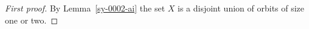 \begin{proof}[First proof]\label{sy-0004-ai}
By Lemma~\ref{sy-0002-ai} the set $X$ is a disjoint union of orbits of size one or two.
\end{proof}